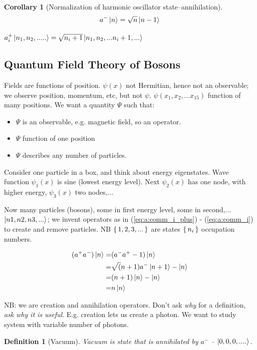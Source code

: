 \documentclass[]{article}
\newtheorem{defn}[thm]{Definition}
\newtheorem{cor}[thm]{Corollary}
\begin{document}
\begin{cor}[Normalization of harmonic oscillator state--annihilation]
	\begin{align*}
	a^-\ket{n}=\sqrt{n}\ket{n-1}
	\end{align*}
\end{cor}


$a_i^+\ket{n_1,n_2,.....}=\sqrt{n_i+1}\ket{n_1,n_2,...n_i+1,...}$

\subsection{Quantum Field Theory of Bosons}

Fields are functions of position. $\psi(x)$ not Hermitian, hence not an observable; we observe position, momentum, etc, but not $\psi$. $\psi(x_1,x_2,...x_{15})$ function of many positions. We want a quantity $\Psi$ such that:

\begin{itemize}
	\item $\Psi$ is an observable, e.g. magnetic field, so an operator.
	\item $\Psi$ function of one position
	\item $\Psi$ describes any number of particles.
\end{itemize}


Consider one particle in a box, and think about energy eigenstates. Wave function $\psi_1(x)$ is sine (lowest energy level). Next $\psi_2(x)$ has one node, with higher energy, $\psi_3(x)$ two nodes,...

Now many particles (bosons), some in first energy level, some in second,...$\ket{n1,n2,n3,...}$;  we invent operators as in (\ref{eq:a:comm_i_plus}) - (\ref{eq:a:comm_i}) to create and remove particles. NB $\set{1,2,3,...}$ are states $\set{n_i}$ occupation numbers.

\begin{align*}
(a^+a^-)\ket{n}=&(a^-a^+-1)\ket{n}\\
=&\sqrt(n+1)a^-\ket{n+1}-\ket{n}\\
=&(n+1)\ket{n}-\ket{n}\\
=&n\ket{n}
\end{align*}

NB: we are  creation and annihilation operators. Don't ask \emph{why} for a definition, \emph{ask why it is useful}. E.g. creation lets us create a photon. We want to study system with variable number of photons.

\begin{defn}[Vacuum]
	Vacuum is state that is annihilated by $a^-$ -- $\ket{0,0,0,....}$.
\end{defn}
\end{document}
